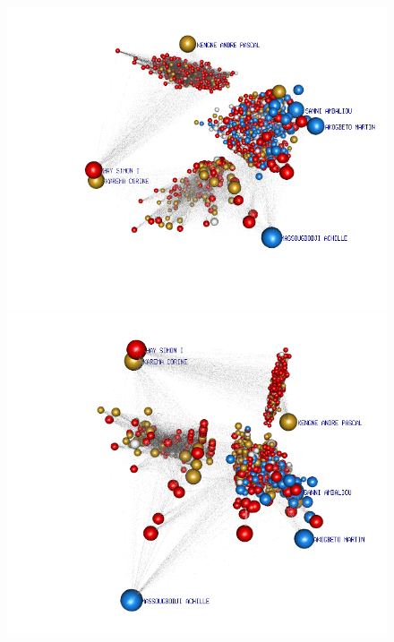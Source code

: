 \begin{figure}[!h]
\center
\includegraphics[scale=0.3,trim={5cm 0 0 0}]{Chapters/malaria/statMod/lnm_mod1_null.png}
\vspace{0px}\\
\includegraphics[scale=0.3,trim={5cm 0 0 0}]{Chapters/malaria/statMod/lnm_mod5_nodes.png}
\vspace{2px}\\

\end{figure}
